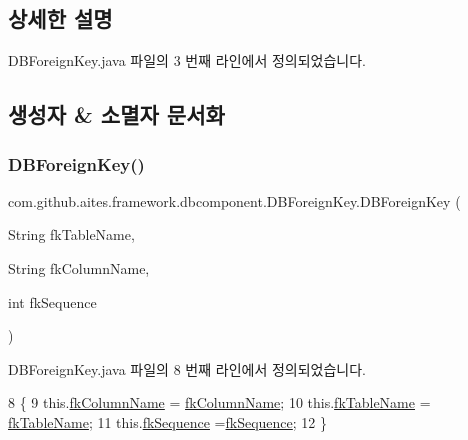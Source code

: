 \subsection{상세한 설명}


D\+B\+Foreign\+Key.\+java 파일의 3 번째 라인에서 정의되었습니다.



\subsection{생성자 \& 소멸자 문서화}
\mbox{\label{classcom_1_1github_1_1aites_1_1framework_1_1dbcomponent_1_1_d_b_foreign_key_ae690a7ce8e1785fd4667acd68b179ed1}} 
\subsubsection{\texorpdfstring{D\+B\+Foreign\+Key()}{DBForeignKey()}}
{\footnotesize\ttfamily com.\+github.\+aites.\+framework.\+dbcomponent.\+D\+B\+Foreign\+Key.\+D\+B\+Foreign\+Key (\begin{DoxyParamCaption}\item[{String}]{fk\+Table\+Name,  }\item[{String}]{fk\+Column\+Name,  }\item[{int}]{fk\+Sequence }\end{DoxyParamCaption})}



D\+B\+Foreign\+Key.\+java 파일의 8 번째 라인에서 정의되었습니다.


\begin{DoxyCode}
8                                                                                 \{
9         this.\mbox{\hyperlink{classcom_1_1github_1_1aites_1_1framework_1_1dbcomponent_1_1_d_b_foreign_key_ac28d05682ddf930d7ede1c4fdf3f4993}{fkColumnName}} = \mbox{\hyperlink{classcom_1_1github_1_1aites_1_1framework_1_1dbcomponent_1_1_d_b_foreign_key_ac28d05682ddf930d7ede1c4fdf3f4993}{fkColumnName}};
10         this.\mbox{\hyperlink{classcom_1_1github_1_1aites_1_1framework_1_1dbcomponent_1_1_d_b_foreign_key_a3d52e561c9c88175073171fe085fa59f}{fkTableName}} = \mbox{\hyperlink{classcom_1_1github_1_1aites_1_1framework_1_1dbcomponent_1_1_d_b_foreign_key_a3d52e561c9c88175073171fe085fa59f}{fkTableName}};
11         this.\mbox{\hyperlink{classcom_1_1github_1_1aites_1_1framework_1_1dbcomponent_1_1_d_b_foreign_key_acfa6d7ed488af53aeec44f6d7b8ced59}{fkSequence}} =\mbox{\hyperlink{classcom_1_1github_1_1aites_1_1framework_1_1dbcomponent_1_1_d_b_foreign_key_acfa6d7ed488af53aeec44f6d7b8ced59}{fkSequence}};
12     \}
\end{DoxyCode}


